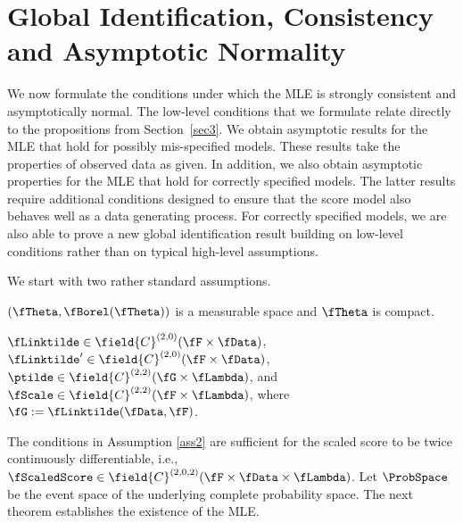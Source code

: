 


\section{Global Identification, Consistency and Asymptotic Normality} %
\label{sec4}


We now formulate the conditions under which the MLE is strongly consistent and asymptotically normal.
The low-level conditions that we formulate relate directly to the propositions from
Section~\ref{sec3}.
We obtain asymptotic results for the MLE that hold for possibly mis-specified models. These results take the properties of observed data as given. In addition, we also obtain asymptotic properties for the MLE that hold for correctly specified models. The latter results require additional conditions designed to ensure that the score model also behaves well as a data generating process. 
For correctly specified models, we are also able to prove a
new global identification result building on low-level conditions rather than on typical high-level assumptions.

We start with two rather standard assumptions.

\begin{ass}
\label{ass1}
$(\fTheta,\fBorel(\fTheta))$ is a measurable space and $\fTheta$ is  compact.
\end{ass}

\begin{ass}
\label{ass2}
$\fLinktilde\in \field{C}^{(2,0)}(\fF\times\fData)$, 
$\fLinktilde'\in \field{C}^{(2,0)}(\fF\times\fData)$, 
$\ptilde \in \field{C}^{(2,2)}(\fG\times \fLambda)$, and 
$\fScale \in \field{C}^{(2,2)}(\fF \times \fLambda)$,
where $\fG:=\fLinktilde(\fData,\fF)$.
\end{ass}

The conditions in Assumption \ref{ass2} are sufficient for the scaled score to be twice continuously differentiable, i.e.,
$\fScaledScore \in \field{C}^{(2,0,2)}(\fF \times \fData \times \fLambda)$. 
Let $\ProbSpace$ be the event space of the underlying complete probability space.
The next theorem establishes the existence of the MLE.

